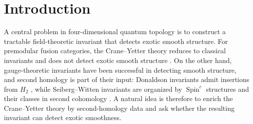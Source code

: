 \section{Introduction}

A central problem in four-dimensional quantum topology is to construct a
tractable field-theoretic invariant that detects exotic smooth structure.
For premodular fusion categories, the Crane--Yetter theory
reduces to classical invariants and does not detect exotic smooth structure
\cite{Reutter2023}.  On the other hand, gauge-theoretic invariants have been
successful in detecting smooth structure, and second homology is part of
their input: Donaldson invariants admit insertions from $H_2$
\cite{Donaldson1990}, while Seiberg--Witten invariants are organized by
$\operatorname{Spin}^c$ structures and their classes in second cohomology
\cite{Witten1994}.  A natural idea is therefore to enrich the Crane--Yetter
theory by second-homology data and ask whether the resulting invariant can
detect exotic smoothness.

